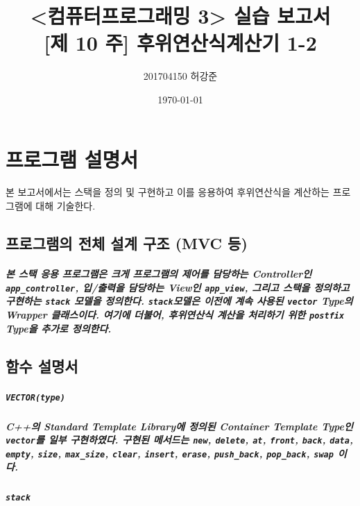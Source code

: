 \documentclass[UTF8]{report}
\title{%
    <컴퓨터프로그래밍 3> 실습 보고서 \\
    \large [제 10 주] 후위연산식계산기 1-2}
\author{201704150 허강준}
\date{\today}
\begin{document}
    \maketitle
    \tableofcontents

    \chapter{프로그램 설명서}
        본 보고서에서는 스택을 정의 및 구현하고 이를 응용하여 후위연산식을 계산하는 프로그램에 대해 기술한다.

        \section{프로그램의 전체 설계 구조 (MVC 등)}

            \paragraph{%
                \normalfont 본 스택 응용 프로그램은 크게 프로그램의 제어를 담당하는 Controller인 \texttt{app\_controller}, 입/출력을 담당하는 View인 \texttt{app\_view}, 그리고 스택을 정의하고 구현하는 \texttt{stack} 모델을 정의한다. \texttt{stack}모델은 이전에 계속 사용된 \texttt{vector} Type의 Wrapper 클래스이다. 여기에 더불어, 후위연산식 계산을 처리하기 위한 \texttt{postfix} Type을 추가로 정의한다.
            }

        \section{함수 설명서}

            \paragraph{\texttt{VECTOR(type)}}
            \paragraph{%
                \normalfont C++의 Standard Template Library에 정의된 Container Template Type인 \texttt{vector}를 일부 구현하였다. 구현된 메서드는 \texttt{new},  \texttt{delete}, \texttt{at}, \texttt{front}, \texttt{back}, \texttt{data}, \texttt{empty}, \texttt{size}, \texttt{max\_size}, \texttt{clear}, \texttt{insert}, \texttt{erase}, \texttt{push\_back}, \texttt{pop\_back}, \texttt{swap} 이다.
            }

            \paragraph{\texttt{stack}}
\end{document}
